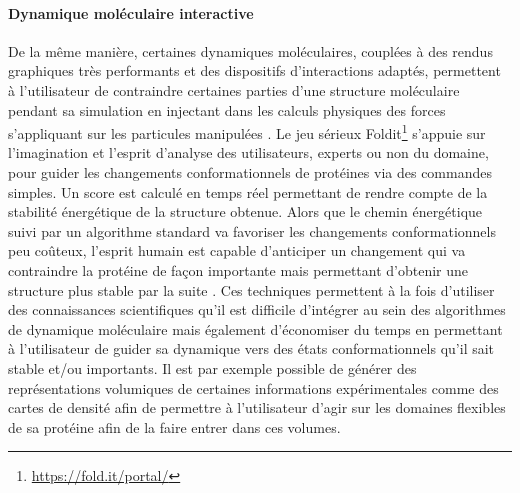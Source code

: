 \paragraph {Dynamique moléculaire interactive}

De la même manière, certaines dynamiques moléculaires, couplées à des rendus graphiques très performants et des dispositifs d'interactions adaptés, permettent à l'utilisateur de contraindre certaines parties d'une structure moléculaire pendant sa simulation en injectant dans les calculs physiques des forces s'appliquant sur les particules manipulées \cite{bolopion_comparing_2010}. Le jeu sérieux Foldit\footnote{\url{https://fold.it/portal/}} s'appuie sur l’imagination et l'esprit d'analyse des utilisateurs, experts ou non du domaine, pour guider les changements conformationnels de protéines via des commandes simples. Un score est calculé en temps réel permettant de rendre compte de la stabilité énergétique de la structure obtenue. Alors que le chemin énergétique suivi par un algorithme standard va favoriser les changements conformationnels peu coûteux, l'esprit humain est capable d'anticiper un changement qui va contraindre la protéine de façon importante mais permettant d'obtenir une structure plus stable par la suite \cite{khatib2011crystal}.
Ces techniques permettent à la fois d'utiliser des connaissances scientifiques qu'il est difficile d'intégrer au sein des algorithmes de dynamique moléculaire mais également d'économiser du temps en permettant à l'utilisateur de guider sa dynamique vers des états conformationnels qu'il sait stable et/ou importants.
Il est par exemple possible de générer des représentations volumiques de certaines informations expérimentales comme des cartes de densité afin de permettre à l'utilisateur d'agir sur les domaines flexibles de sa protéine afin de la faire entrer dans ces volumes.

